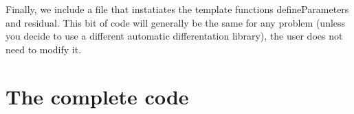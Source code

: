 \begin{DoxyCodeInclude}

\end{DoxyCodeInclude}


Finally, we include a file that instatiates the template functions {\ttfamily define\-Parameters} and {\ttfamily residual}. This bit of code will generally be the same for any problem (unless you decide to use a different automatic differentation library), the user does not need to modify it.


\begin{DoxyCodeInclude}

\end{DoxyCodeInclude}


\section*{The complete code }


\begin{DoxyCodeInclude}
\end{DoxyCodeInclude}
 